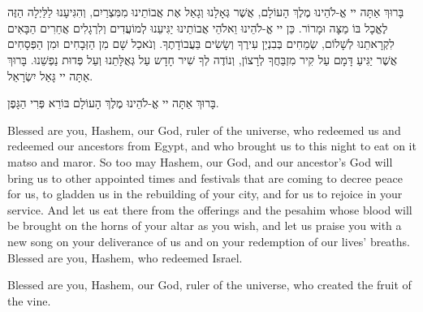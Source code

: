 \ \\


\break


\ \\


בָּרוּךְ אַתָּה יי אֱ-לֹהֵינוּ מֶלֶךְ הָעוֹלָם, אֲשֶׁר גְּאָלָנוּ וְגָאַל אֶת אֲבוֹתֵינוּ מִמִּצְרַיִם, וְהִגִּיעָנוּ לַלַּיְלָה הַזֶּה לֶאֱכָל בּוֹ מַצָּה וּמָרוֹר. כֵּן יי אֱ-לֹהֵינוּ וֵאלֹהֵי אֲבוֹתֵינוּ יַגִּיעֵנוּ לְמוֹעֲדִים וְלִרְגָלִים אֲחֵרִים הַבָּאִים לִקְרָאתֵנוּ לְשָׁלוֹם, שְׂמֵחִים בְּבִנְיַן עִירֶךָ וְשָׂשִׂים בַּעֲבוֹדָתֶךָ. וְנֹאכַל שָׁם מִן הַזְּבָחִים וּמִן הַפְּסָחִים אֲשֶׁר יַגִּיעַ דָּמָם עַל קִיר מִזְבַּחֲךָ לְרָצוֹן, וְנוֹדֶה לְךָ שִׁיר חָדָש עַל גְּאֻלָּתֵנוּ וְעַל פְּדוּת נַפְשֵׁנוּ. בָּרוּךְ אַתָּה יי גָּאַל יִשְׂרָאֵל.

בָּרוּךְ אַתָּה יי אֱ-לֹהֵינוּ מֶלֶךְ הָעוֹלָם בּוֹרֵא פְּרִי הַגָּפֶן.

\begin{english}
Blessed are you, Hashem, our God, ruler of the universe, who redeemed us and redeemed our ancestors from Egypt, and who brought us to this night to eat on it matso and maror. So too may Hashem, our God, and our ancestor's God will bring us to other appointed times and festivals that are coming to decree peace for us, to gladden us in the rebuilding of your city, and for us to rejoice in your service. And let us eat there from the offerings and the pesahim whose blood will be brought on the horns of your altar as you wish, and let us praise you with a new song on your deliverance of us and on your redemption of our lives' breaths. Blessed are you, Hashem, who redeemed Israel.

Blessed are you, Hashem, our God, ruler of the universe, who created the fruit of the vine.
\end{english}

\begin{center}
\end{center} 